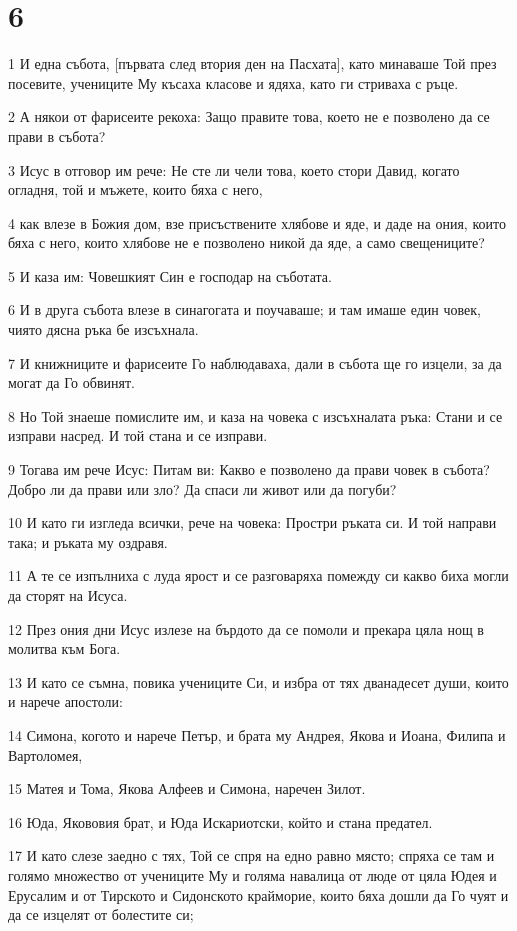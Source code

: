 \chapter{6}

\par 1 И една събота, [първата след втория ден на Пасхата], като минаваше Той през посевите, учениците Му късаха класове и ядяха, като ги стриваха с ръце.
\par 2 А някои от фарисеите рекоха: Защо правите това, което не е позволено да се прави в събота?
\par 3 Исус в отговор им рече: Не сте ли чели това, което стори Давид, когато огладня, той и мъжете, които бяха с него,
\par 4 как влезе в Божия дом, взе присъствените хлябове и яде, и даде на ония, които бяха с него, които хлябове не е позволено никой да яде, а само свещениците?
\par 5 И каза им: Човешкият Син е господар на съботата.
\par 6 И в друга събота влезе в синагогата и поучаваше; и там имаше един човек, чиято дясна ръка бе изсъхнала.
\par 7 И книжниците и фарисеите Го наблюдаваха, дали в събота ще го изцели, за да могат да Го обвинят.
\par 8 Но Той знаеше помислите им, и каза на човека с изсъхналата ръка: Стани и се изправи насред. И той стана и се изправи.
\par 9 Тогава им рече Исус: Питам ви: Какво е позволено да прави човек в събота? Добро ли да прави или зло? Да спаси ли живот или да погуби?
\par 10 И като ги изгледа всички, рече на човека: Простри ръката си. И той направи така; и ръката му оздравя.
\par 11 А те се изпълниха с луда ярост и се разговаряха помежду си какво биха могли да сторят на Исуса.
\par 12 През ония дни Исус излезе на бърдото да се помоли и прекара цяла нощ в молитва към Бога.
\par 13 И като се съмна, повика учениците Си, и избра от тях дванадесет души, които и нарече апостоли:
\par 14 Симона, когото и нарече Петър, и брата му Андрея, Якова и Иоана, Филипа и Вартоломея,
\par 15 Матея и Тома, Якова Алфеев и Симона, наречен Зилот.
\par 16 Юда, Якововия брат, и Юда Искариотски, който и стана предател.
\par 17 И като слезе заедно с тях, Той се спря на едно равно място; спряха се там и голямо множество от учениците Му и голяма навалица от люде от цяла Юдея и Ерусалим и от Тирското и Сидонското крайморие, които бяха дошли да Го чуят и да се изцелят от болестите си;
